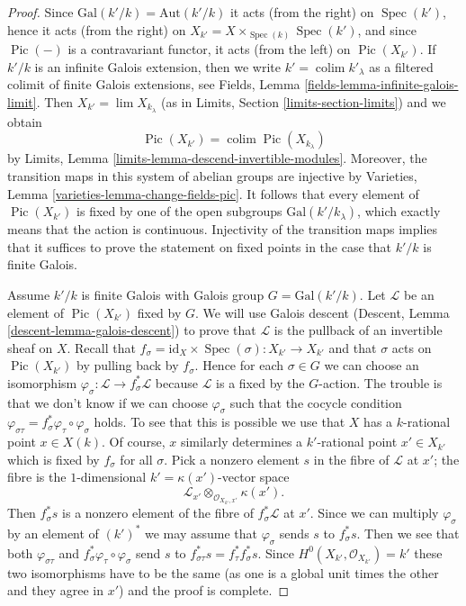 \documentclass[10pt,a4paper]{amsart}
\theoremstyle{plain}
\theoremstyle{definition}
\theoremstyle{remark}
\numberwithin{equation}{subsection}
\def\lim{\mathop{\mathrm{lim}}\nolimits}
\def\colim{\mathop{\mathrm{colim}}\nolimits}
\def\Spec{\mathop{\mathrm{Spec}}}
\def\Pic{\mathop{\mathrm{Pic}}\nolimits}
\begin{document}
\begin{proof}
Since $\text{Gal}(k'/k) = \text{Aut}(k'/k)$ it acts (from the right)
on $\Spec(k')$, hence it acts (from the right) on
$X_{k'} = X \times_{\Spec(k)} \Spec(k')$, and since $\Pic(-)$
is a contravariant functor, it acts (from the left) on $\Pic(X_{k'})$.
If $k'/k$ is an infinite Galois extension, then we write
$k' = \colim k'_\lambda$ as a filtered colimit of finite Galois
extensions, see Fields, Lemma \ref{fields-lemma-infinite-galois-limit}.
Then $X_{k'} = \lim X_{k_\lambda}$
(as in Limits, Section \ref{limits-section-limits})
and we obtain
$$
\Pic(X_{k'}) = \colim \Pic(X_{k_\lambda})
$$
by Limits, Lemma \ref{limits-lemma-descend-invertible-modules}.
Moreover, the transition maps in this system of abelian groups
are injective by Varieties, Lemma \ref{varieties-lemma-change-fields-pic}.
It follows that every element of $\Pic(X_{k'})$ is fixed by
one of the open subgroups $\text{Gal}(k'/k_\lambda)$, which exactly
means that the action is continuous. Injectivity of the transition maps
implies that it suffices to prove the statement on fixed points in the
case that $k'/k$ is finite Galois.

\medskip\noindent
Assume $k'/k$ is finite Galois with Galois group $G = \text{Gal}(k'/k)$.
Let $\mathcal{L}$ be an element of $\Pic(X_{k'})$ fixed by $G$.
We will use Galois descent (Descent, Lemma \ref{descent-lemma-galois-descent})
to prove that $\mathcal{L}$ is the pullback of an invertible sheaf on $X$.
Recall that $f_\sigma = \text{id}_X \times \Spec(\sigma) : X_{k'} \to X_{k'}$
and that $\sigma$ acts on $\Pic(X_{k'})$ by pulling back by $f_\sigma$.
Hence for each $\sigma \in G$ we can choose an isomorphism
$\varphi_\sigma : \mathcal{L} \to f_\sigma^*\mathcal{L}$
because $\mathcal{L}$ is a fixed by the $G$-action.
The trouble is that we don't know if we can choose
$\varphi_\sigma$ such that the cocycle condition
$\varphi_{\sigma\tau} = f_\sigma^*\varphi_\tau \circ \varphi_\sigma$
holds. To see that this is possible we use that $X$ has a $k$-rational point
$x \in X(k)$. Of course, $x$ similarly determines a $k'$-rational point
$x' \in X_{k'}$ which is fixed by $f_\sigma$ for all $\sigma$.
Pick a nonzero element $s$ in the fibre of $\mathcal{L}$ at $x'$;
the fibre is the $1$-dimensional $k' = \kappa(x')$-vector space
$$
\mathcal{L}_{x'} \otimes_{\mathcal{O}_{X_{k'}, x'}} \kappa(x').
$$
Then $f_\sigma^*s$ is a nonzero element of the fibre of
$f_\sigma^*\mathcal{L}$ at $x'$. Since we can multiply $\varphi_\sigma$
by an element of $(k')^*$ we may assume that $\varphi_\sigma$ sends
$s$ to $f_\sigma^*s$. Then we see that both $\varphi_{\sigma\tau}$ and
$f_\sigma^*\varphi_\tau \circ \varphi_\sigma$
send $s$ to $f_{\sigma\tau}^*s = f_\tau^*f_\sigma^*s$.
Since $H^0(X_{k'}, \mathcal{O}_{X_{k'}}) = k'$ these two isomorphisms
have to be the same (as one is a global unit times the other
and they agree in $x'$) and the proof is complete.
\end{proof}
\end{document}
